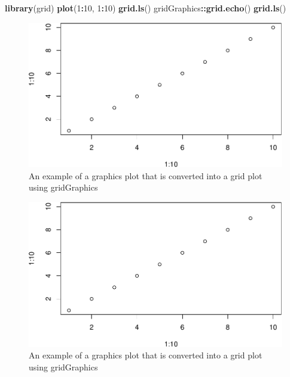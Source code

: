 \documentclass[11pt,]{report}
\newenvironment{Shaded}{\begin{snugshade}}{\end{snugshade}}
\newcommand{\KeywordTok}[1]{\textcolor[rgb]{0.13,0.29,0.53}{\textbf{#1}}}
\newcommand{\DecValTok}[1]{\textcolor[rgb]{0.00,0.00,0.81}{#1}}
\newcommand{\OperatorTok}[1]{\textcolor[rgb]{0.81,0.36,0.00}{\textbf{#1}}}
\newcommand{\NormalTok}[1]{#1}
\begin{document}
\begin{Shaded}
\begin{Highlighting}[]
\KeywordTok{library}\NormalTok{(grid)}
\KeywordTok{plot}\NormalTok{(}\DecValTok{1}\OperatorTok{:}\DecValTok{10}\NormalTok{, }\DecValTok{1}\OperatorTok{:}\DecValTok{10}\NormalTok{)}
\KeywordTok{grid.ls}\NormalTok{()}
\NormalTok{gridGraphics}\OperatorTok{::}\KeywordTok{grid.echo}\NormalTok{()}
\KeywordTok{grid.ls}\NormalTok{()}
\end{Highlighting}
\end{Shaded}

\begin{figure}[H]

{\centering \includegraphics{figures/unnamed-chunk-79-1} 

}

\caption{\label{fig:gg-convert} An example of a graphics plot that is converted into a grid plot using gridGraphics}\label{fig:unnamed-chunk-791}
\end{figure}

\begin{figure}[H]

{\centering \includegraphics{figures/unnamed-chunk-79-2} 

}

\caption{\label{fig:gg-convert} An example of a graphics plot that is converted into a grid plot using gridGraphics}\label{fig:unnamed-chunk-792}
\end{figure}
\end{document}
